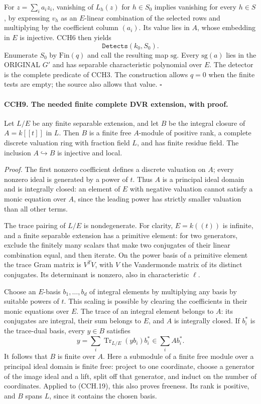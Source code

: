 For $z=\sum_i a_i z_i$, vanishing of $L_h(z)$ for $h\in S_0$
implies vanishing for every $h\in S$, by expressing $v_h$ as
an $E$-linear combination of the selected rows and multiplying
by the coefficient column $(a_i)$.  Its value lies in $A$,
whose embedding in $E$ is injective.  CCH6 then yields
\[
                         \texttt{Detects}(k_0,S_0).
 \tag{CCH.18}
\]
Enumerate $S_0$ by $\mathrm{Fin}(q)$ and call the resulting
map $\mathrm{sg}$.  Every $\mathrm{sg}(a)$ lies in the
ORIGINAL $G'$ and has separable characteristic polynomial
over $E$.  The detector is the complete predicate of CCH3.
The construction allows $q=0$ when the finite tests are empty;
the source also allows that value.
\hfill$\square$

\paragraph{CCH9. The needed finite complete DVR extension, with proof.}
\label{claim:CCH9}
Let $L/E$ be any finite separable extension, and let $B$ be
the integral closure of $A=k[[t]]$ in $L$.  Then $B$ is a
finite free $A$-module of positive rank, a complete discrete
valuation ring with fraction field $L$, and has finite residue
field.  The inclusion $A\hookrightarrow B$ is injective and local.

\emph{Proof.}
The first nonzero coefficient defines a discrete valuation on
$A$; every nonzero ideal is generated by a power of $t$.
Thus $A$ is a principal ideal domain and is integrally closed:
an element of $E$ with negative valuation cannot satisfy a
monic equation over $A$, since the leading power has strictly
smaller valuation than all other terms.

The trace pairing of $L/E$ is nondegenerate.  For clarity,
$E=k((t))$ is infinite, and a finite separable extension has a
primitive element: for two generators, exclude the finitely
many scalars that make two conjugates of their linear
combination equal, and then iterate.  On the power basis of
a primitive element the trace Gram matrix is $V^TV$, with
$V$ the Vandermonde matrix of its distinct conjugates.
Its determinant is nonzero, also in characteristic $\ell$.

Choose an $E$-basis $b_1,\ldots,b_d$ of integral elements
by multiplying any basis by suitable powers of $t$.
This scaling is possible by clearing the coefficients in
their monic equations over $E$.  The trace of an integral
element belongs to $A$: its conjugates are integral, their
sum belongs to $E$, and $A$ is integrally closed.
If $b_i^*$ is the trace-dual basis, every $y\in B$ satisfies
\[
                  y=\sum_i\operatorname{Tr}_{L/E}(yb_i)b_i^*
                        \in\sum_i A b_i^*.             \tag{CCH.19}
\]
It follows that $B$ is finite over $A$.  Here a submodule of
a finite free module over a principal ideal domain is finite
free: project to one coordinate, choose a generator of the
image ideal and a lift, split off that generator, and induct
on the number of coordinates.  Applied to (CCH.19), this
also proves freeness.  Its rank is positive, and $B$ spans
$L$, since it contains the chosen basis.

